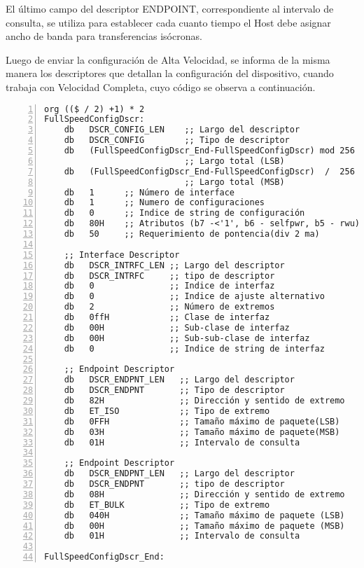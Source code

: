 	El último campo del descriptor ENDPOINT, correspondiente al intervalo de consulta, se utiliza para establecer cada cuanto tiempo el Host debe asignar ancho de banda para transferencias isócronas.
	
	Luego de enviar la configuración de Alta Velocidad, se informa de la misma manera los descriptores que detallan la configuración del dispositivo, cuando trabaja con Velocidad Completa, cuyo código se observa a continuación.
	
	\begin{lstlisting}[language={[x86masm]Assembler},backgroundcolor=\color{gray!30},numbers=left]
org (($ / 2) +1) * 2
FullSpeedConfigDscr:
	db   DSCR_CONFIG_LEN	;; Largo del descriptor
	db   DSCR_CONFIG        ;; Tipo de descriptor
	db   (FullSpeedConfigDscr_End-FullSpeedConfigDscr) mod 256
							;; Largo total (LSB)
	db   (FullSpeedConfigDscr_End-FullSpeedConfigDscr)  /  256 
							;; Largo total (MSB)
	db   1      ;; Número de interface
	db   1      ;; Numero de configuraciones
	db   0      ;; Indice de string de configuración
	db   80H    ;; Atributos (b7 -<'1', b6 - selfpwr, b5 - rwu)
	db   50     ;; Requerimiento de pontencia(div 2 ma)
	
	;; Interface Descriptor
	db   DSCR_INTRFC_LEN ;; Largo del descriptor
	db   DSCR_INTRFC     ;; tipo de descriptor
	db   0               ;; Indice de interfaz
	db   0               ;; Indice de ajuste alternativo
	db   2               ;; Número de extremos
	db   0ffH            ;; Clase de interfaz
	db   00H             ;; Sub-clase de interfaz
	db   00H             ;; Sub-sub-clase de interfaz
	db   0               ;; Indice de string de interfaz
	
	;; Endpoint Descriptor
	db   DSCR_ENDPNT_LEN   ;; Largo del descriptor
	db   DSCR_ENDPNT       ;; Tipo de descriptor
	db   82H               ;; Dirección y sentido de extremo
	db   ET_ISO            ;; Tipo de extremo
	db   0FFH              ;; Tamaño máximo de paquete(LSB)
	db   03H               ;; Tamaño máximo de paquete(MSB)
	db   01H               ;; Intervalo de consulta
	
	;; Endpoint Descriptor
	db   DSCR_ENDPNT_LEN   ;; Largo del descriptor
	db   DSCR_ENDPNT       ;; tipo de descriptor
	db   08H               ;; Dirección y sentido de extremo
	db   ET_BULK           ;; Tipo de extremo
	db   040H              ;; Tamaño máximo de paquete (LSB)
	db   00H               ;; Tamaño máximo de paquete (MSB)
	db   01H               ;; Intervalo de consulta
	
FullSpeedConfigDscr_End:
	\end{lstlisting}

